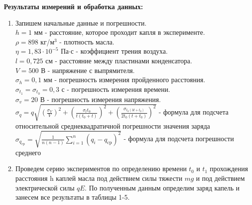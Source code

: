\documentclass[a4paper, 12pt]{article}%
\begin{document}
	\textbf{Результаты измерений и обработка данных: }\\
	\begin{enumerate}
	\item Запишем начальные данные и погрешности.\\
	$ h = 1$ мм - расстояние, которое проходит капля в эксперименте.\\
	$ \rho = 898 $ кг/м$^3$ - плотность масла. \\
	$ \eta = 1,83 \cdot 10^{-5}$ Па$\cdot$с - коэффициент трения воздуха.\\ 
	$ l = 0,725$ см - расстояние между пластинами конденсатора.\\
	$V = 500$ В - напряжение с выпрямителя.\\
	$\sigma_h = 0,1$ мм - погрешность измерения пройденного расстояния.\\
	$\sigma_{t_1} = \sigma_{t_0} = 0,3$ с - погрешность измерения времени.\\
	$ \sigma_v = 20 $ В - погрешность измерения напряжения.\\
	$\sigma_q = q\sqrt{(\frac{\sigma_V}{V})^2 + (\frac{\sigma_t t_0}{t(t_0 + t)})^2 + (\frac{\sigma_{t_0(3t + t_0)}}{2t_0(t+t_0)})^2}$ -  формула для подсчета относительной среднеквадратичной погрешности значения заряда\\
	$\sigma_{q_{\mathrm{cp}}}=\sqrt{\frac{1}{n(n-1)} \sum_{i=1}^n\left(q_i-q_{\mathrm{cp}}\right)^2}$ - формула для подсчета погрешности среднего
	
	\item Проведем серию экспериментов по определению времени $t_0$ и $t_1$ прохождения расстояния h каплей масла под действием силы тяжести $mg$ и под действием электрической силы $qE$. По полученным данным определим заряд капель и занесем все результаты в таблицы 1-5.
	
	\newpage



\end{enumerate}
\end{document}
